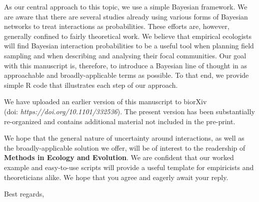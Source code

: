\documentclass[12pt]{letter}
\begin{document}
\begin{letter}


    As our central approach to this topic, we use a simple Bayesian framework. We are aware that there are several studies already using various forms of Bayesian networks to treat interactions as probabilities. These efforts are, however, generally confined to fairly theoretical work. We believe that empirical ecologists will find Bayesian interaction probabilities to be a useful tool when planning field sampling and when describing and analysing their focal communities. Our goal with this manuscript is, therefore, to introduce a Bayesian line of thought in as approachable and broadly-applicable terms as possible. To that end, we provide simple R code that illustrates each step of our approach. 


    We have uploaded an earlier version of this manuscript to biorXiv \\(doi: \emph{https://doi.org/10.1101/332536}). The present version has been substantially re-organized and contains additional material not included in the pre-print.


    We hope that the general nature of uncertainty around interactions, as well as the broadly-applicable solution we offer, will be of interest to the readership of \textbf{Methods in Ecology and Evolution}. We are confident that our worked example and easy-to-use scripts will provide a useful template for empiricists and theoreticians alike. We hope that you agree and eagerly await your reply.


\closing{Best regards,}


\end{letter}
\end{document}
